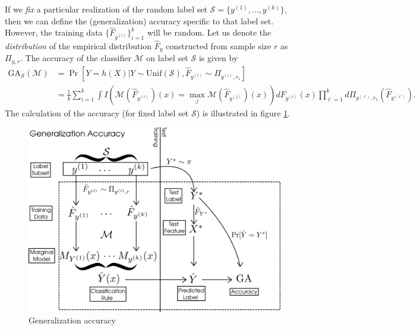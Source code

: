 \documentclass[12pt]{article}
\begin{document}
If we \emph{fix} a particular realization of the random label set
$\mathcal{S} = \{y^{(1)}, \hdots, y^{(k)}\}$, then we can define the
(generalization) accuracy specific to that label set.  However, the
training data $\{\hat{F}_{y^{(i)}}\}_{i=1}^k$ will be random.  Let us
denote the \emph{distribution} of the empirical distribution
$\hat{F}_y$ constructed from sample size $r$ as $\Pi_{y, r}$.  The
accuracy of the classifier $\mathcal{M}$ on label set $\mathcal{S}$ is
given by
\begin{align*}
\text{GA}_{\mathcal{S}}(\mathcal{M}) &= \Pr[Y = h(X)|Y \sim
  \text{Unif}(\mathcal{S}), \hat{F}_{y^{(i)}} \sim \Pi_{y^{(i)}, r_1}] \\&= \frac{1}{k} \sum_{i=1}^k \int
I(\mathcal{M}(\hat{F}_{y^{(i)}})(x) = \max_j
\mathcal{M}(\hat{F}_{y^{(j)}})(x)) dF_{y^{(i)}}(x) \prod_{\ell=1}^k
d\Pi_{y^{(\ell)}, r_1}(\hat{F}_{y^{(\ell)}}).
\end{align*}
The calculation of the accuracy (for fixed label set $\mathcal{S}$) is
illustrated in figure \ref{fig:risk}.

\begin{figure}[h]
\centering
\includegraphics[scale = 0.3]{risk.png}
\caption{Generalization accuracy}\label{fig:risk}
\end{figure}
\end{document}
